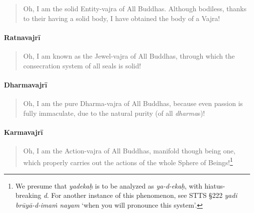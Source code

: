 \documentclass[11pt]{book}
\newcommand{\skt}[1]{\emph{#1}}
\begin{document}
\begin{verse}
Oh, I am the solid Entity-vajra of All Buddhas. Although bodiless,  thanks to their having a solid body, I have obtained the body of a Vajra!
\end{verse}

\paragraph{Ratnavajrī}

\begin{verse}
Oh, I am known as the Jewel-vajra of All Buddhas, through which the consecration system of all seals is solid!
\end{verse}

\paragraph{Dharmavajrī}

\begin{verse}
Oh, I am the pure Dharma-vajra of All Buddhas, because even passion is fully immaculate, due to the natural purity (of all \skt{dharma}s)!
\end{verse}

\paragraph{Karmavajrī}

\begin{verse}
Oh, I am the Action-vajra of All Buddhas, manifold though being one, which properly carries out the actions of the whole Sphere of Beings!\footnote{We presume that \skt{yadekaḥ} is to be analyzed as \skt{ya-d-ekaḥ}, with hiatus-breaking \skt{d}. For another instance of this phenomenon, see STTS §222 \skt{yadi brūyā-d-imaṁ nayam} `when you will pronounce this system'.}\\
\end{verse}
\end{document}

